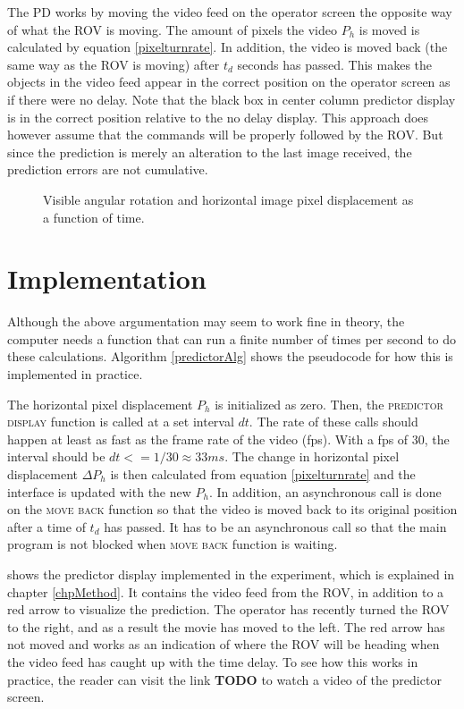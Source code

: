 The PD works by moving the video feed on the operator screen the opposite way of what the ROV is moving. The amount of pixels the video $P_h$ is moved is calculated by equation \ref{pixelturnrate}. In addition, the video is moved back (the same way as the ROV is moving) after $t_d$ seconds has passed. This makes the objects in the video feed appear in the correct position on the operator screen as if there were no delay. Note that the black box in  center column predictor display is in the correct position relative to the no delay display. This approach does however assume that the commands will be properly followed by the ROV. But since the prediction is merely an alteration to the last image received, the prediction errors are not cumulative.


\begin{figure}[h!]    
    \centering           
    \def\svgwidth{\columnwidth}
    
    \caption{Visible angular rotation and horizontal image pixel displacement as a function of time.}
    \label{timePlot}
\end{figure}

\section{Implementation}

Although the above argumentation may seem to work fine in theory, the computer needs a function that can run a finite number of times per second to do these calculations. Algorithm \ref{predictorAlg} shows the pseudocode for how this is implemented in practice.

The horizontal pixel displacement $P_h$ is initialized as zero. Then, the \textsc{predictor display} function is called at a set interval $dt$. The rate of these calls should happen at least as fast as the frame rate of the video (fps). With a fps of 30, the interval should be $dt <= 1/30 \approx 33 ms$. The change in horizontal pixel displacement $\Delta P_h$ is then calculated from equation \ref{pixelturnrate} and the interface is updated with the new $P_h$. In addition, an asynchronous call is done on the \textsc{move back} function so that the video is moved back to its original position after a time of $t_d$ has passed. It has to be an asynchronous call so that the main program is not blocked when \textsc{move back} function is waiting.




 shows the predictor display implemented in the experiment, which is explained in chapter \ref{chpMethod}. It contains the video feed from the ROV, in addition to a red arrow to visualize the prediction. The operator has recently turned the ROV to the right, and as a result the movie has moved to the left. The red arrow has not moved and works as an indication of where the ROV will be heading when the video feed has caught up with the time delay. To see how this works in practice, the reader can visit the link \textbf{TODO} to watch a video of the predictor screen.

